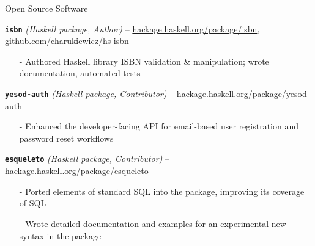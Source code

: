 \documentclass{resume} %
\begin{document}
\begin{rSection}{Open Source Software}

\begin{rListSection}
\item \textbf{\texttt{isbn}} {\em (Haskell package, Author)} -- \href{https://hackage.haskell.org/package/isbn}{hackage.haskell.org/package/isbn}, \href{https://github.com/charukiewicz/hs-isbn}{github.com/charukiewicz/hs-isbn}
    \begin{itemize} \itemsep -0.5em \vspace{-0.5em}
            \item[-] Authored Haskell library ISBN validation \& manipulation; wrote documentation, automated tests
    \end{itemize}
\item \textbf{\texttt{yesod-auth}} {\em (Haskell package, Contributor)} -- \href{https://hackage.haskell.org/package/yesod-auth}{hackage.haskell.org/package/yesod-auth}
    \begin{itemize} \itemsep -0.5em \vspace{-0.5em}
    \item[-] Enhanced the developer-facing API for email-based user registration and password reset workflows
    \end{itemize}
\item \textbf{\texttt{esqueleto}} {\em (Haskell package, Contributor)} -- \href{https://hackage.haskell.org/package/esqueleto}{hackage.haskell.org/package/esqueleto}
    \begin{itemize} \itemsep -0.5em \vspace{-0.5em}
    \item[-] Ported elements of standard SQL into the package, improving its coverage of SQL
    \item[-] Wrote detailed documentation and examples for an experimental new syntax in the package
    \end{itemize}
\end{rListSection}

\end{rSection}






\end{document}
